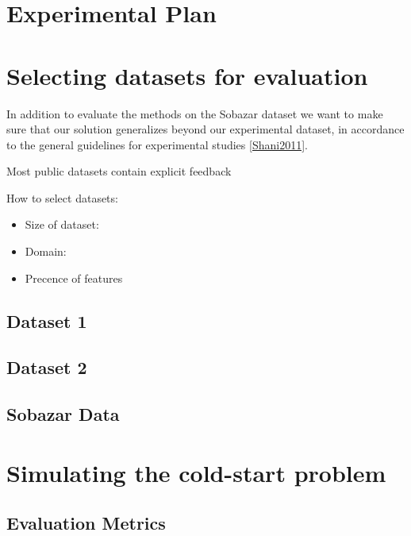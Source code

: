 \section{Experimental Plan}



\section{Selecting datasets for evaluation}

In addition to evaluate the methods on the Sobazar dataset we want to make sure that our solution generalizes beyond our experimental dataset, in accordance to the general guidelines for experimental studies \ref{Shani2011}.

Most public datasets contain explicit feedback

How to select datasets:
\begin{itemize}
\item Size of dataset:
\item Domain:
\item Precence of features
\end{itemize} 



\subsection{Dataset 1}
\subsection{Dataset 2}
\subsection{Sobazar Data}




\section{Simulating the cold-start problem}



\subsection{Evaluation Metrics}
